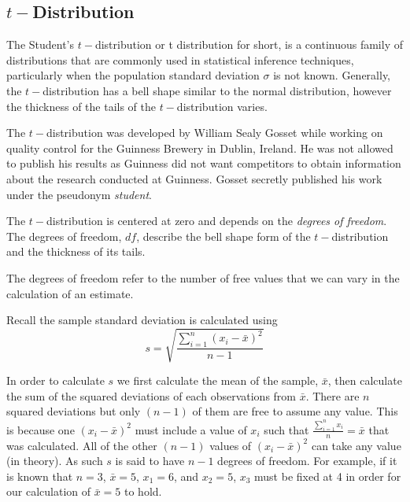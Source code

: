 \subsection{$t-$Distribution}
\label{sectiontDistribution}

The Student's $t-$distribution or t distribution for short, is a continuous family of 
distributions that are commonly used in statistical inference techniques, 
particularly when the population standard deviation $\sigma$ is not known. Generally, the $t-$distribution has a bell shape similar to the normal distribution, however the thickness of the tails of the $t-$distribution varies.

\begin{nt}
The $t-$distribution was developed by William Sealy Gosset while working on quality control for the Guinness Brewery in Dublin, Ireland. He was not allowed to publish his results as Guinness did not want competitors to obtain information about the research conducted at Guinness. Gosset secretly published his work under the pseudonym {\em{student}}.
\end{nt}


The $t-$distribution is centered at zero and depends on the {\em{degrees of freedom}}. The degrees of freedom, $df$, describe the bell shape form of the $t-$distribution and the thickness of its tails.

\begin{definition}
The degrees of freedom refer to the number of free values that we can vary in the calculation of an estimate.
\end{definition}

\begin{example}
Recall the sample standard deviation is calculated using
	\begin{equation}
	s = \sqrt{ \frac{ \displaystyle\sum_{i=1}^{n} (x_{i} - \bar{x})^{2} }{ n-1 } }
	\end{equation}

In order to calculate $s$ we first calculate the mean of the sample, $\bar{x}$, then calculate the sum of the squared deviations of each observations from $\bar{x}$. There are $n$ squared deviations but only $(n - 1)$ of them are free to assume any value. This is because one $(x_{i} - \bar{x})^{2}$ must include a value of $x_{i}$ such that $\frac{ \sum_{i=1}^{n} x_{i} }{n} = \bar{x}$ that was calculated. All of the other $(n - 1)$ values of $(x_{i} - \bar{x})^{2}$ can take any value (in theory). As such $s$ is said to have $n-1$ degrees of freedom. For example, if it is known that $n=3$, $\bar{x}=5$, $x_1=6$, and $x_2=5$, $x_3$ must be fixed at 4 in order for our calculation of $\bar{x}=5$ to hold. 
\end{example}

